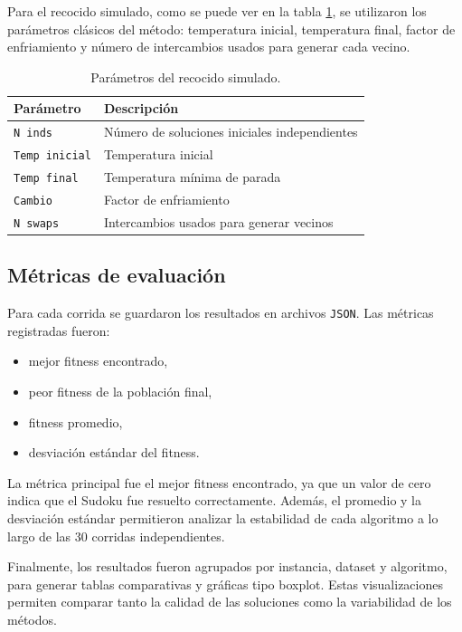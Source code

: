 \documentclass{article}
\begin{document}
Para el recocido simulado, como se puede ver en la tabla \ref{tab:__}, se utilizaron los parámetros clásicos del método: temperatura inicial, temperatura final, factor de enfriamiento y número de intercambios usados para generar cada vecino.

\begin{table}[H]
\centering
\caption{Parámetros del recocido simulado.}
\label{tab:__}
\begin{tabular}{ll}
\hline
Parámetro & Descripción \\
\hline
\texttt{N inds} & Número de soluciones iniciales independientes \\
\texttt{Temp inicial} & Temperatura inicial \\
\texttt{Temp final} & Temperatura mínima de parada \\
\texttt{Cambio} & Factor de enfriamiento \\
\texttt{N swaps} & Intercambios usados para generar vecinos \\
\hline
\end{tabular}
\end{table}

\subsection{Métricas de evaluación}

Para cada corrida se guardaron los resultados en archivos \texttt{JSON}. Las métricas registradas fueron:

\begin{itemize}
    \item mejor fitness encontrado,
    \item peor fitness de la población final,
    \item fitness promedio,
    \item desviación estándar del fitness.
\end{itemize}

La métrica principal fue el mejor fitness encontrado, ya que un valor de cero indica que el Sudoku fue resuelto correctamente. Además, el promedio y la desviación estándar permitieron analizar la estabilidad de cada algoritmo a lo largo de las 30 corridas independientes.

Finalmente, los resultados fueron agrupados por instancia, dataset y algoritmo, para generar tablas comparativas y gráficas tipo boxplot. Estas visualizaciones permiten comparar tanto la calidad de las soluciones como la variabilidad de los métodos.\\
\uline{\hfill \phantom{-} \hfill}
\end{document}

